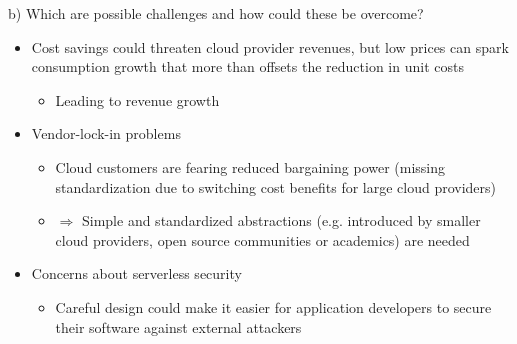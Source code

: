 \documentclass{article}
\begin{document}
b) Which are possible challenges and how could these be overcome?
\begin{itemize}
    \item Cost savings could threaten cloud provider revenues, but low prices can spark consumption growth that more than offsets the reduction in unit costs
          \begin{itemize}
              \item Leading to revenue growth
          \end{itemize}
    \item Vendor-lock-in problems
          \begin{itemize}
              \item Cloud customers are fearing reduced bargaining power (missing standardization due to switching cost benefits for large cloud providers)
              \item \(\Rightarrow\) Simple and standardized abstractions (e.g. introduced by smaller cloud providers, open source communities or academics) are needed
          \end{itemize}
    \item Concerns about serverless security
          \begin{itemize}
              \item Careful design could make it easier for application developers to secure their software against external attackers
          \end{itemize}
\end{itemize}
\end{document}
